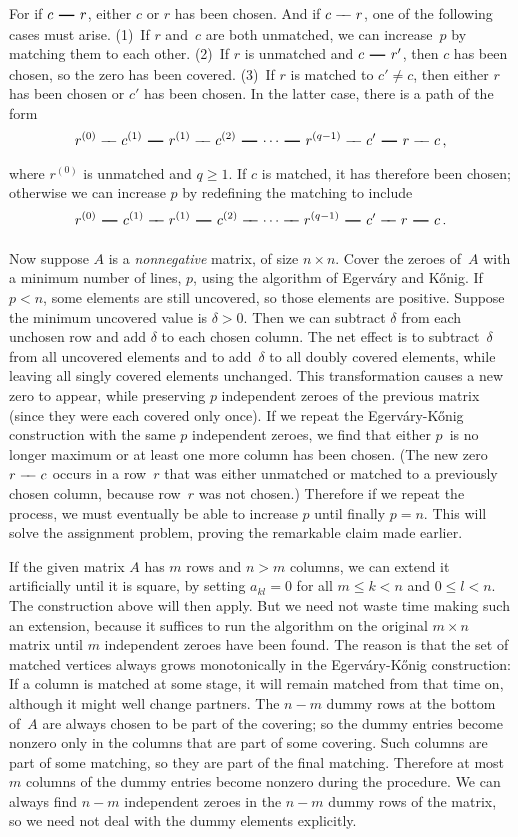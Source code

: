 For if $c\ddash r$, either $c$ or $r$ has been chosen. And
if $c\dash r$, one of the following cases must arise. (1)~If $r$ and~$c$
are both unmatched, we can increase~$p$ by matching them to each other.
(2)~If $r$ is unmatched and $c\ddash r'$, then $c$ has been chosen, so
the zero has been covered. (3)~If $r$ is matched to $c'\ne c$, then
either $r$ has been chosen or $c'$ has been chosen. In the latter case,
there is a path of the form
$$r^{(0)}\dash c^{(1)}\ddash r^{(1)}\dash c^{(2)}\ddash\cdots\ddash
r^{(q-1)}\dash c'\ddash r\dash c\,,$$
where $r^{(0)}$ is unmatched and $q\ge1$.
If $c$ is matched, it has therefore been chosen; otherwise we can increase $p$
by redefining the matching to include
$$r^{(0)}\ddash c^{(1)}\dash r^{(1)}\ddash c^{(2)}\dash\cdots\dash
r^{(q-1)}\ddash c'\dash r\ddash c\,.$$

\fi

Now suppose $A$ is a {\sl nonnegative\/} matrix, of size $n\times n$.
Cover the zeroes of~$A$ with a minimum number of lines, $p$, using the
algorithm of Egerv\'ary and K\H{o}nig. If $p<n$, some elements are still
uncovered, so those elements are positive. Suppose the minimum uncovered
value is $\delta>0$. Then we can subtract $\delta$ from each unchosen row
and add $\delta$ to each chosen column. The net effect is to subtract~$\delta$
from all uncovered elements and to add~$\delta$ to all doubly covered
elements, while leaving all singly covered elements unchanged. This
transformation causes a new zero to appear, while preserving
$p$ independent zeroes of the previous matrix (since they were each
\vadjust{\goodbreak}%
covered only once). If we repeat the Egerv\'ary-K\H{o}nig construction
with the same $p$ independent zeroes, we find that either $p$~is no
longer maximum or at least one more column has been chosen.
(The new zero $r\dash c$ occurs in a row~$r$ that was either unmatched
or matched to a previously chosen column, because row~$r$ was not
chosen.) Therefore if we repeat the process, we must eventually
be able to increase $p$ until finally $p=n$. This will solve the
assignment problem, proving the remarkable claim made earlier.

\fi

If the given matrix $A$ has $m$ rows and $n>m$ columns,
we can extend it artificially
until it is square, by setting $a_{kl}=0$ for all $m\le k<n$ and
$0\le l<n$. The construction above will then apply. But we need not
waste time making such an extension, because it suffices to run the
algorithm on the original $m\times n$ matrix until $m$ independent zeroes
have been found. The reason is that the set of matched vertices always
grows monotonically in the Egerv\'ary-K\H{o}nig construction: If a
column is matched at some stage, it will remain matched from that time on,
although it might well change partners. The $n-m$ dummy rows at the bottom
of~$A$ are always chosen to be part of the covering; so the dummy entries
become nonzero only in the columns that are part of some covering.
Such columns are part of some matching, so they are part of the
final matching. Therefore at most $m$ columns of the dummy entries
become nonzero during the procedure. We can always find $n-m$ independent
zeroes in the $n-m$ dummy rows of the matrix, so we need not deal with the
dummy elements explicitly.


